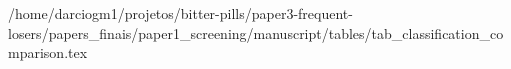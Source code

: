 /home/darciogm1/projetos/bitter-pills/paper3-frequent-losers/papers_finais/paper1_screening/manuscript/tables/tab_classification_comparison.tex